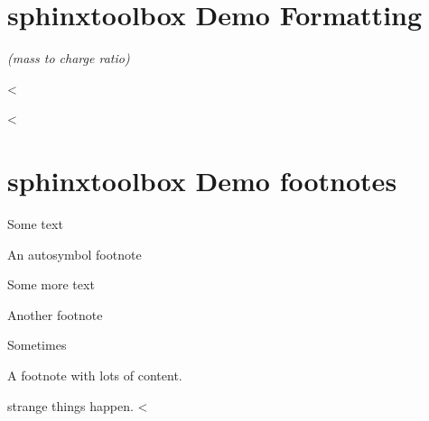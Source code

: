 \documentclass[letterpaper,10pt,english]{sphinxmanual}
\newcommand\thesymbolfootnote{\fnsymbol{footnote}}\let\thenumberfootnote\thefootnote
\begin{document}
\chapter{sphinx\sphinxhyphen{}toolbox Demo \sphinxhyphen{} Formatting}
\label{\detokenize{formatting:sphinx-toolbox-demo-formatting}}\label{\detokenize{formatting::doc}}
\textit{ (mass to charge ratio)}

\textit{}

\vspace{10px}

\vspace{10px}
<%

\sphinxstepscope<%


\chapter{sphinx\sphinxhyphen{}toolbox Demo \sphinxhyphen{} footnotes}
\label{\detokenize{footnote_symbols:sphinx-toolbox-demo-footnotes}}\label{\detokenize{footnote_symbols::doc}}
Some text %
\renewcommand\thefootnote{\thesymbolfootnote}\begin{footnote}[2]\sphinxAtStartFootnote
An auto\sphinxhyphen{}symbol footnote
%
\end{footnote}\renewcommand\thefootnote{\thenumberfootnote}

Some more text %
\renewcommand\thefootnote{\thesymbolfootnote}\begin{footnote}[3]\sphinxAtStartFootnote
Another footnote
%
\end{footnote}\renewcommand\thefootnote{\thenumberfootnote}

Sometimes %
\renewcommand\thefootnote{\thesymbolfootnote}\begin{footnote}[4]\sphinxAtStartFootnote
A footnote with lots of content.

\sphinxSetupCodeBlockInFootnote
\begin{sphinxVerbatim}[commandchars=\\\{\}]
\end{sphinxVerbatim}
%
\end{footnote}\renewcommand\thefootnote{\thenumberfootnote} strange things happen.
<%
\end{document}
